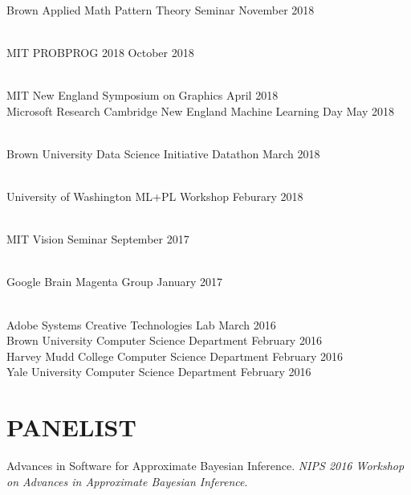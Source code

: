 \documentclass[line,margin]{res}
\begin{document}
\begin{resume}
\\
\talk
	{Brown Applied Math}
	{Pattern Theory Seminar}
	{November 2018}

\\
\talk
	{MIT}
	{PROBPROG 2018}
	{October 2018}

\\
\talk
	{MIT}
	{New England Symposium on Graphics}
	{April 2018}\\
\talk
	{Microsoft Research Cambridge}
	{New England Machine Learning Day}
	{May 2018}

\\
\talk
	{Brown University Data Science Initiative}
	{Datathon}
	{March 2018}

\\
\talk
	{University of Washington}
	{ML+PL Workshop}
	{Feburary 2018}

\\
\talk
	{MIT}
	{Vision Seminar}
	{September 2017}

\\
\talk
	{Google Brain}
	{Magenta Group}
	{January 2017}

\\
\talk
	{Adobe Systems}
	{Creative Technologies Lab}
	{March 2016}\\
\talk
	{Brown University}
	{Computer Science Department}
	{February 2016}\\
\talk
	{Harvey Mudd College}
	{Computer Science Department}
	{February 2016}\\
\talk
	{Yale University}
	{Computer Science Department}
	{February 2016}


\section{PANELIST}

\newcommand{\panelist}[2]{
	#1. \emph{#2}.
}

\panelist{Advances in Software for Approximate Bayesian Inference}{NIPS 2016 Workshop on Advances in Approximate Bayesian Inference}



\end{resume}
\end{document}

